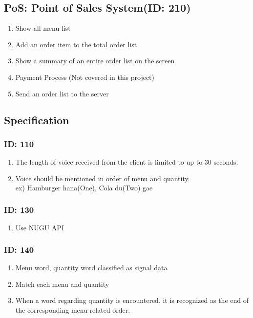 \documentclass[conference,compsoc]{IEEEtran}
\begin{document}
\subsection{PoS: Point of Sales System(ID: 210)}
\begin{enumerate}
  \item Show all menu list
  \item Add an order item to the total order list
  \item Show a summary of an entire order list on the screen
  \item Payment Process (Not covered in this project)
  \item Send an order list to the server
\end{enumerate}

\subsection{Specification}

\subsubsection{ID: 110}
\begin{enumerate}
  \item The length of voice received from the client is limited to up to 30 seconds.
  \item Voice should be mentioned in order of menu and quantity. \\
  ex) Hamburger hana(One), Cola du(Two) gae
\end{enumerate}

\subsubsection{ID: 130}
\begin{enumerate}
  \item Use NUGU API
\end{enumerate}

\subsubsection{ID: 140}
\begin{enumerate}
  \item Menu word, quantity word classified as signal data
  \item Match each menu and quantity
  \item When a word regarding quantity is encountered, it is recognized as the end of the corresponding menu-related order.
\end{enumerate}
\end{document}
